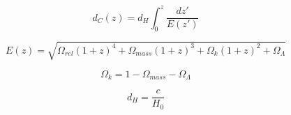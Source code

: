 \documentclass[11pt,letterpaper]{article}
\begin{document}
\begin{equation}
d_C(z) = d_H\int_{0}^{z} \frac{dz'}{E(z')}
\end{equation}

\begin{equation}
E(z) = \sqrt{\Omega_{rel}(1+z)^4+\Omega_{mass}(1+z)^3+\Omega_k(1+z)^2+\Omega_{\Lambda}}
\end{equation}

\begin{equation}
\Omega_k = 1-\Omega_{mass}-\Omega_{\Lambda} 
\end{equation}

\begin{equation}
d_H = \frac{c}{H_0}
\end{equation}
\end{document}
